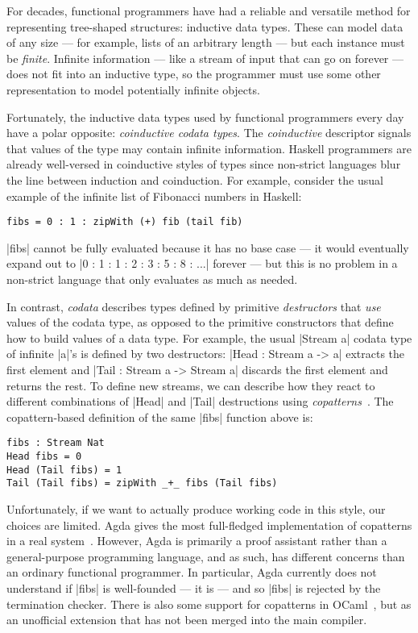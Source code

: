 For decades, functional programmers have had a reliable and versatile method for representing tree-shaped structures: inductive data types.
These can model data of any size --- for example, lists of an arbitrary length --- but each instance must be \emph{finite}.
Infinite information --- like a stream of input that can go on forever --- does not fit into an inductive type, so the programmer must use some other representation to model potentially infinite objects.

Fortunately, the inductive data types used by functional programmers every day have a polar opposite: \emph{coinductive codata types}.
The \emph{coinductive} descriptor signals that values of the type may contain infinite information.
Haskell programmers are already well-versed in coinductive styles of types since non-strict languages blur the line between induction and coinduction.
For example, consider the usual example of the infinite list of Fibonacci numbers in Haskell:
\begin{verbatim}
fibs = 0 : 1 : zipWith (+) fib (tail fib)
\end{verbatim}
\hs|fibs| cannot be fully evaluated because it has no base case --- it would eventually expand out to \hs|0 : 1 : 1 : 2 : 3 : 5 : 8 : ...| forever --- but this is no problem in a non-strict language that only evaluates as much as needed.

In contrast, \emph{codata} describes types defined by primitive \emph{destructors} that \emph{use} values of the codata type, as opposed to the primitive constructors that define how to build values of a data type.
For example, the usual \agda|Stream a| codata type of infinite \agda|a|'s is defined by two destructors: \agda|Head : Stream a -> a| extracts the first element and \agda|Tail : Stream a -> Stream a| discards the first element and returns the rest.
To define new streams, we can describe how they react to different combinations of \agda|Head| and \agda|Tail| destructions using \emph{copatterns}~\cite{APTS2013C}.  The copattern-based definition of the same \agda|fibs| function above is:
\begin{verbatim}
fibs : Stream Nat
Head fibs = 0
Head (Tail fibs) = 1
Tail (Tail fibs) = zipWith _+_ fibs (Tail fibs)
\end{verbatim}
Unfortunately, if we want to actually produce working code in this style, our choices are limited.
Agda gives the most full-fledged implementation of copatterns in a real system~\cite{ElaboratingDependentCopatterns}.
However, Agda is primarily a proof assistant rather than a general-purpose programming language, and as such, has different concerns than an ordinary functional programmer.
In particular, Agda currently does not understand if \agda|fibs| is well-founded --- it is --- and so \agda|fibs| is rejected by the termination checker.
There is also some support for copatterns in OCaml~\cite{LaforgueR17}, but as an unofficial extension that has not been merged into the main compiler.

